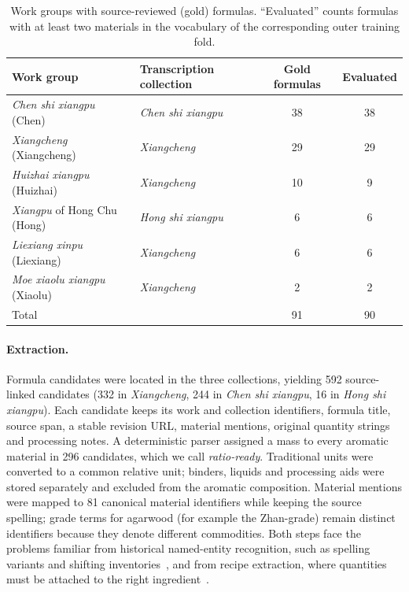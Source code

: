 \documentclass[10pt,a4paper]{article}
\begin{document}
\begin{table}[H]
\caption{Work groups with source-reviewed (gold) formulas. ``Evaluated'' counts formulas with at least two materials in the vocabulary of the corresponding outer training fold.}
\label{tab:works}
\small
\begin{tabularx}{\textwidth}{Llcc}
\toprule
\textbf{Work group} & \textbf{Transcription collection} & \textbf{Gold formulas} & \textbf{Evaluated} \\
\midrule
\emph{Chen shi xiangpu} (Chen) & \emph{Chen shi xiangpu} & 38 & 38 \\
\emph{Xiangcheng} (Xiangcheng) & \emph{Xiangcheng} & 29 & 29 \\
\emph{Huizhai xiangpu} (Huizhai) & \emph{Xiangcheng} & 10 & 9 \\
\emph{Xiangpu} of Hong Chu (Hong) & \emph{Hong shi xiangpu} & 6 & 6 \\
\emph{Liexiang xinpu} (Liexiang) & \emph{Xiangcheng} & 6 & 6 \\
\emph{Moe xiaolu xiangpu} (Xiaolu) & \emph{Xiangcheng} & 2 & 2 \\
\midrule
Total & & 91 & 90 \\
\bottomrule
\end{tabularx}
\end{table}

\paragraph{Extraction.} Formula candidates were located in the three collections, yielding 592 source-linked candidates (332 in \emph{Xiangcheng}, 244 in \emph{Chen shi xiangpu}, 16 in \emph{Hong shi xiangpu}). Each candidate keeps its work and collection identifiers, formula title, source span, a stable revision URL, material mentions, original quantity strings and processing notes. A deterministic parser assigned a mass to every aromatic material in 296 candidates, which we call \emph{ratio-ready}. Traditional units were converted to a common relative unit; binders, liquids and processing aids were stored separately and excluded from the aromatic composition. Material mentions were mapped to 81 canonical material identifiers while keeping the source spelling; grade terms for agarwood (for example the Zhan-grade) remain distinct identifiers because they denote different commodities. Both steps face the problems familiar from historical named-entity recognition, such as spelling variants and shifting inventories~\cite{sorbi2026}, and from recipe extraction, where quantities must be attached to the right ingredient~\cite{goel2024}.
\end{document}
